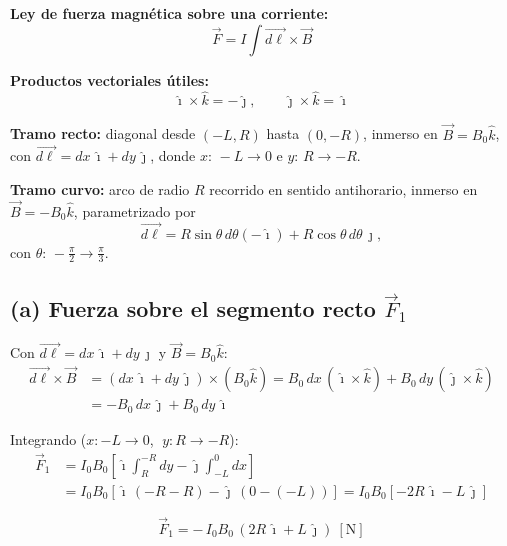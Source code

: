 \documentclass[12pt,letterpaper]{article}
\begin{document}
\begin{minipage}[t]{0.50\textwidth}
    \vspace{0pt}
    \textbf{Ley de fuerza magn\'etica sobre una corriente:}
    \[
        \vec{F} = I\!\int \vec{d\ell}\times\vec{B}
    \]

    \smallskip
    \textbf{Productos vectoriales \'utiles:}
    \[
        \hat{\imath}\times\hat{k} = -\hat{\jmath},\qquad
        \hat{\jmath}\times\hat{k} = \hat{\imath}
    \]

    \smallskip
    \textbf{Tramo recto:} diagonal desde $(-L,R)$ hasta $(0,-R)$, inmerso
    en $\vec{B}=B_0\hat{k}$, con $\vec{d\ell}=dx\,\hat{\imath}+dy\,\hat{\jmath}$,
    donde $x:\,-L\to 0$ e $y:\,R\to -R$.

    \smallskip
    \textbf{Tramo curvo:} arco de radio $R$ recorrido en sentido
    antihorario, inmerso en $\vec{B}=-B_0\hat{k}$, parametrizado por
    \[
        \vec{d\ell}=R\sin\theta\,d\theta(-\hat{\imath})+R\cos\theta\,d\theta\,\hat{\jmath},
    \]
    con $\theta:\,-\tfrac{\pi}{2}\to \tfrac{\pi}{3}$.
\end{minipage}

\bigskip

\subsection*{(a) Fuerza sobre el segmento recto $\vec{F}_1$}

Con $\vec{d\ell}=dx\,\hat{\imath}+dy\,\hat{\jmath}$ y $\vec{B}=B_0\hat{k}$:
\begin{align*}
    \vec{d\ell}\times\vec{B}
      &= (dx\,\hat{\imath}+dy\,\hat{\jmath})\times(B_0\hat{k})
       = B_0\,dx\,(\hat{\imath}\times\hat{k}) + B_0\,dy\,(\hat{\jmath}\times\hat{k}) \\[4pt]
      &= -B_0\,dx\,\hat{\jmath} + B_0\,dy\,\hat{\imath}
\end{align*}

Integrando ($x:-L\to0$, $\;y:R\to-R$):
\begin{align*}
    \vec{F}_1 &= I_0 B_0\left[\hat{\imath}\int_{R}^{-R} dy
                 - \hat{\jmath}\int_{-L}^{0} dx\right] \\[4pt]
              &= I_0 B_0\left[\hat{\imath}\,(-R-R) - \hat{\jmath}\,(0-(-L))\right]
               = I_0 B_0\left[-2R\,\hat{\imath} - L\,\hat{\jmath}\right]
\end{align*}

\[
    \boxed{\vec{F}_1 = -\,I_0 B_0\,(2R\,\hat{\imath} + L\,\hat{\jmath})\ [\text{N}]}
\]
\end{document}
